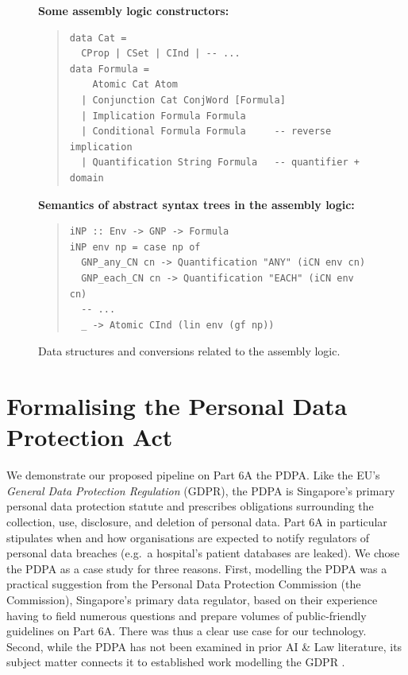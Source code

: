 \documentclass{IOS-Book-Article}
\newcommand{\bequ}{\begin{quote}}
\newcommand{\enqu}{\end{quote}}
\begin{document}
\begin{figure}
  \begin{framed}

 \textbf{Some assembly logic constructors:}
 \bequ
\begin{verbatim}
data Cat =
  CProp | CSet | CInd | -- ...
data Formula =
    Atomic Cat Atom
  | Conjunction Cat ConjWord [Formula]
  | Implication Formula Formula
  | Conditional Formula Formula     -- reverse implication
  | Quantification String Formula   -- quantifier + domain
\end{verbatim}
 \enqu

 \textbf{Semantics of abstract syntax trees in the assembly logic:}
 \bequ
\begin{verbatim}
iNP :: Env -> GNP -> Formula
iNP env np = case np of
  GNP_any_CN cn -> Quantification "ANY" (iCN env cn)
  GNP_each_CN cn -> Quantification "EACH" (iCN env cn)
  -- ...
  _ -> Atomic CInd (lin env (gf np))
\end{verbatim}
 \enqu

   \end{framed}
 \caption{Data structures and conversions related to the assembly logic.
 }
\label{assembly}
\end{figure}


\section{Formalising the Personal Data Protection Act}
\label{sec:pdpa}

We demonstrate our proposed pipeline on Part 6A the PDPA. Like the EU's \textit{General Data Protection Regulation} (GDPR), the PDPA is Singapore's primary personal data protection statute and prescribes obligations surrounding the collection, use, disclosure, and deletion of personal data. Part 6A in particular stipulates when and how organisations are expected to notify regulators of personal data breaches (e.g.\ a hospital's patient databases are leaked). We chose the PDPA as a case study for three reasons. First, modelling the PDPA was a practical suggestion from the Personal Data Protection Commission (the Commission), Singapore's primary data regulator, based on their experience having to field numerous questions and prepare volumes of public-friendly guidelines on Part 6A. There was thus a clear use case for our technology. Second, while the PDPA has not been examined in prior AI \& Law literature, its subject matter connects it to established work modelling the GDPR \cite{palmirani_modelling_2018, brennan_gdpr_2021, hickey_gdpr_2021}.
\end{document}
